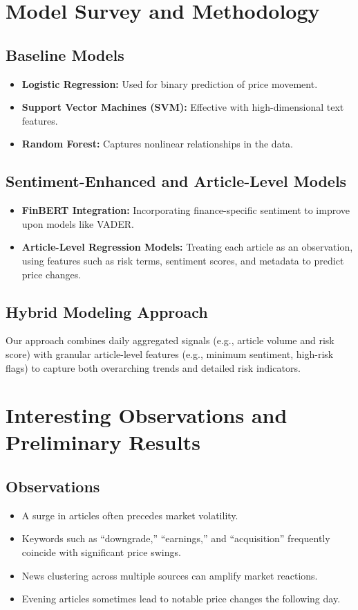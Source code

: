 \documentclass[twocolumn]{article}
\begin{document}
\section{Model Survey and Methodology}
\subsection{Baseline Models}
\begin{itemize}
    \item \textbf{Logistic Regression:} Used for binary prediction of price movement.
    \item \textbf{Support Vector Machines (SVM):} Effective with high-dimensional text features.
    \item \textbf{Random Forest:} Captures nonlinear relationships in the data.
\end{itemize}

\subsection{Sentiment-Enhanced and Article-Level Models}
\begin{itemize}
    \item \textbf{FinBERT Integration:} Incorporating finance-specific sentiment to improve upon models like VADER.
    \item \textbf{Article-Level Regression Models:} Treating each article as an observation, using features such as risk terms, sentiment scores, and metadata to predict price changes.
\end{itemize}

\subsection{Hybrid Modeling Approach}
Our approach combines daily aggregated signals (e.g., article volume and risk score) with granular article-level features (e.g., minimum sentiment, high-risk flags) to capture both overarching trends and detailed risk indicators.

\section{Interesting Observations and Preliminary Results}
\subsection{Observations}
\begin{itemize}
    \item A surge in articles often precedes market volatility.
    \item Keywords such as ``downgrade,'' ``earnings,'' and ``acquisition'' frequently coincide with significant price swings.
    \item News clustering across multiple sources can amplify market reactions.
    \item Evening articles sometimes lead to notable price changes the following day.
\end{itemize}
\end{document}

